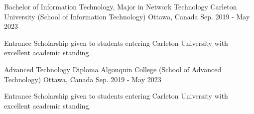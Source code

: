 

\begin{cventries}

  \cventry
    {Bachelor of Information Technology, Major in Network Technology} %
    {Carleton University (School of Information Technology)} %
    {Ottawa, Canada} %
    {Sep. 2019 - May 2023} %
    {
      \begin{cvitems} %
        \item {Entrance Scholarship given to students entering Carleton University with excellent academic standing.}
      \end{cvitems}
    }

  \cventry
    {Advanced Technology Diploma} %
    {Algonquin College (School of Advanced Technology)} %
    {Ottawa, Canada} %
    {Sep. 2019 - May 2023} %
    {
      \begin{cvitems} %
        \item {Entrance Scholarship given to students entering Carleton University with excellent academic standing.}
      \end{cvitems}
    }
\end{cventries}
